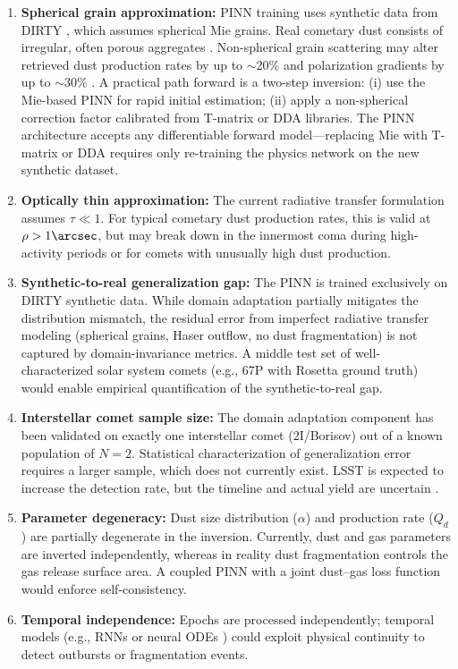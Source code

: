 \documentclass[preprint2]{aastex631}
\begin{document}
\begin{enumerate}
    \item \textbf{Spherical grain approximation:} PINN training uses synthetic data from DIRTY \citep{gordon01}, which assumes spherical Mie grains. Real cometary dust consists of irregular, often porous aggregates \citep{kolokolova04}. Non-spherical grain scattering may alter retrieved dust production rates by up to $\sim$20\% and polarization gradients by up to $\sim$30\% \citep{kolokolova04,shen11}. A practical path forward is a two-step inversion: (i) use the Mie-based PINN for rapid initial estimation; (ii) apply a non-spherical correction factor calibrated from T-matrix or DDA libraries. The PINN architecture accepts any differentiable forward model---replacing Mie with T-matrix or DDA requires only re-training the physics network on the new synthetic dataset.

    \item \textbf{Optically thin approximation:} The current radiative transfer formulation assumes $\tau \ll 1$. For typical cometary dust production rates, this is valid at $\rho > 1\arcsec$, but may break down in the innermost coma during high-activity periods or for comets with unusually high dust production.

    \item \textbf{Synthetic-to-real generalization gap:} The PINN is trained exclusively on DIRTY synthetic data. While domain adaptation partially mitigates the distribution mismatch, the residual error from imperfect radiative transfer modeling (spherical grains, Haser outflow, no dust fragmentation) is not captured by domain-invariance metrics. A middle test set of well-characterized solar system comets (e.g., 67P with Rosetta ground truth) would enable empirical quantification of the synthetic-to-real gap.

    \item \textbf{Interstellar comet sample size:} The domain adaptation component has been validated on exactly one interstellar comet (2I/Borisov) out of a known population of $N=2$. Statistical characterization of generalization error requires a larger sample, which does not currently exist. LSST is expected to increase the detection rate, but the timeline and actual yield are uncertain \citep{jones18}.

    \item \textbf{Parameter degeneracy:} Dust size distribution ($\alpha$) and production rate ($Q_d$) are partially degenerate in the inversion. Currently, dust and gas parameters are inverted independently, whereas in reality dust fragmentation controls the gas release surface area. A coupled PINN with a joint dust--gas loss function would enforce self-consistency.

    \item \textbf{Temporal independence:} Epochs are processed independently; temporal models (e.g., RNNs or neural ODEs \citep{chen18}) could exploit physical continuity to detect outbursts or fragmentation events.
\end{enumerate}
\end{document}
